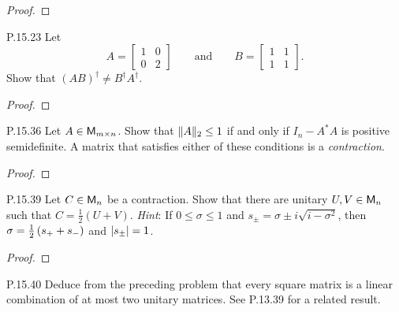 \documentclass{../homework}
\begin{document}
\begin{problems}
  \begin{solution}
    \begin{proof}

    \end{proof}
  \end{solution}

\item[P.15.23] Let
  \[
    A = \begin{bmatrix} 1 & 0 \\ 0 & 2 \end{bmatrix}
    \qquad\text{and}\qquad
    B = \begin{bmatrix} 1 & 1 \\ 1 & 1 \end{bmatrix}.
  \]
  Show that \((AB)^\dagger \ne B^\dagger A^\dagger\).

  \begin{solution}
    \begin{proof}

    \end{proof}
  \end{solution}

\item[P.15.36] Let \(A \in \mathsf{M}_{m \times n}\).  Show that
  \(\lVert {A} \rVert_2 \le 1\) if and only if \(I_n - A^* A\) is positive
  semidefinite.  A matrix that satisfies either of these conditions is
  a \emph{contraction}.

  \begin{solution}
    \begin{proof}

    \end{proof}
  \end{solution}

\item[P.15.39] Let \(C \in \mathsf{M}_n\) be a contraction.  Show that there
  are unitary \(U, V \in \mathsf{M}_n\) such that \(C = \frac 1 2 (U + V)\).
  \textit{Hint}: If \(0 \le \sigma \le 1\) and
  \(s_\pm = \sigma \pm i \sqrt{i-\sigma^2}\), then
  \(\sigma = \frac 1 2 \left( {s_+ + s_-} \right)\) and \(\left\lvert {s_\pm} \right\rvert = 1\).

  \begin{solution}
    \begin{proof}

    \end{proof}
  \end{solution}

\item[P.15.40] Deduce from the preceding problem that every square
  matrix is a linear combination of at most two unitary matrices.  See
  P.13.39 for a related result.


\end{problems}
\end{document}
